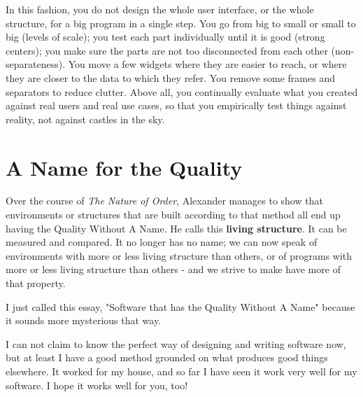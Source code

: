 In this fashion, you do not design the whole user interface, or the whole structure, for a big program in a single step. You go from big to small or small to big (levels of scale); you test each part individually until it is good (strong centers); you make sure the parts are not too disconnected from each other (non-separateness). You move a few widgets where they are easier to reach, or where they are closer to the data to which they refer. You remove some frames and separators to reduce clutter. Above all, you continually evaluate what you created against real users and real use cases, so that you empirically test things against reality, not against castles in the sky.

\section*{A Name for the Quality}

Over the course of \textit{The Nature of Order}, Alexander manages to show that environments or structures that are built according to that method all end up having the Quality Without A Name. He calls this \textbf{living structure}. It can be measured and compared. It no longer has no name; we can now speak of environments with more or less living structure than others, or of programs with more or less living structure than others - and we strive to make have more of that property.

I just called this essay, "Software that has the Quality Without A Name" because it sounds more mysterious that way.

I can not claim to know the perfect way of designing and writing software now, but at least I have a good method grounded on what produces good things elsewhere. It worked for my house, and so far I have seen it work very well for my software. I hope it works well for you, too!


